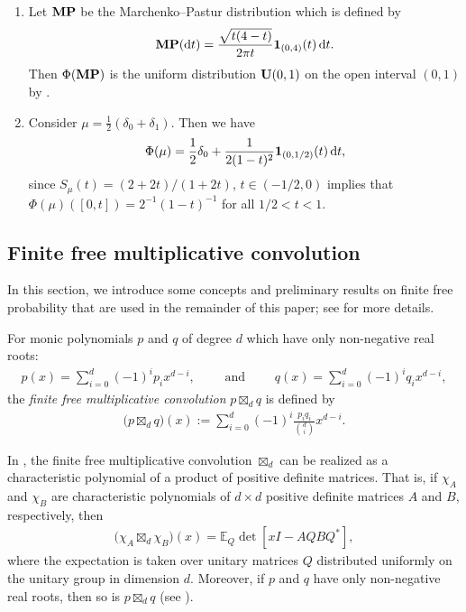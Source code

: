 \documentclass[pdftex]{sigma}
\numberwithin{equation}{section}
\begin{document}
\begin{Example}\label{ex:HMlimit}\quad
\begin{enumerate}
\item[\rm (1)] Let ${\bf MP}$ be the Marchenko--Pastur distribution which is defined by
\begin{align*}
\mathbf{MP}({\rm d}t)=\frac{\sqrt{t(4-t)}}{2\pi t} \mathbf{1}_{(0,4)}(t)\, {\rm d}t.
\end{align*}
Then $\Phi({\bf MP})$ is the uniform distribution ${\bf U}(0,1)$ on the open interval $(0,1)$ by \cite{Ueda21}.
\item[\rm (2)] Consider $\mu=\frac{1}{2}(\delta_0+\delta_1)$. Then we have
\[
\Phi(\mu)=\frac{1}{2}\delta_0+\frac{1}{2(1-t)^2}\mathbf{1}_{(0,1/2)}(t)\,{\rm d}t,
\]
since $S_\mu(t)=(2+2t)/(1+2t)$, $t\in (-1/2,0)$ implies that $\Phi(\mu)([0,t])=2^{-1}(1-t)^{-1}$ for all $1/2 < t < 1$.
\end{enumerate}
\end{Example}


\subsection{Finite free multiplicative convolution}

In this section, we introduce some concepts and preliminary results on finite free probability that are used in the remainder of this paper; see \cite{AVP21, Marcus, MSS22} for more details.

\begin{Definition}\label{defn}
For monic polynomials $p$ and $q$ of degree $d$ which have only non-negative real roots:
\begin{align*}
p(x)=\sum_{i=0}^d (-1)^i p_ix^{d-i}, \qquad \text{ and } \qquad q(x)=\sum_{i=0}^d (-1)^i q_ix^{d-i},
\end{align*}
the {\it finite free multiplicative convolution} $p\boxtimes_d q$ is defined by
\begin{align*}
\big(p\boxtimes_d q\big) (x):= \sum_{i=0}^d(-1)^i \frac{p_iq_i}{\binom{d}{i}} x^{d-i}.
\end{align*}
\end{Definition}

In \cite[Theorem 1.5]{MSS22}, the finite free multiplicative convolution $\boxtimes_d$ can be realized as a characteristic polynomial of a product of positive definite matrices. That is, if $\chi_{A}$ and $\chi_{B}$ are characteristic polynomials of $d\times d$ positive definite matrices $A$ and $B$, respectively, then
\begin{align*}
\big(\chi_{A} \boxtimes_d \chi_{B}\big)(x)=\mathbb{E}_Q \det[x I - AQBQ^*],
\end{align*}
where the expectation is taken over unitary matrices $Q$ distributed uniformly on the unitary group in dimension $d$.
Moreover, if $p$ and $q$ have only non-negative real roots, then so is $p\boxtimes_d q$ (see \cite[Theorem 1.6]{MSS22}).
\end{document}
